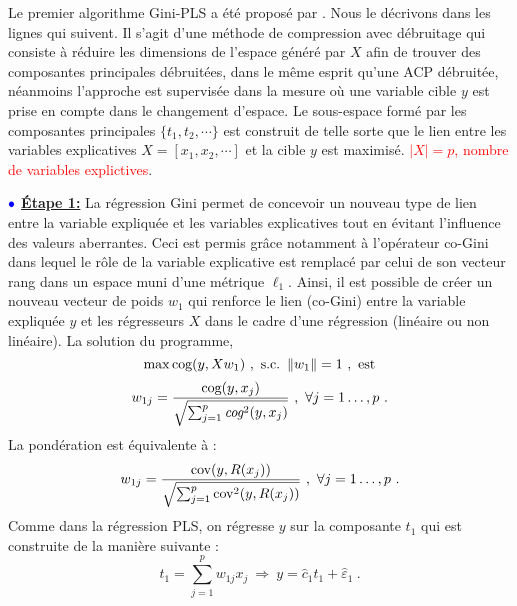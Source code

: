 Le premier algorithme Gini-PLS a été proposé par \citet{mussard2018ginipls}. Nous le décrivons dans les lignes qui suivent. Il s'agit d'une méthode de compression avec débruitage qui consiste à réduire les dimensions de l'espace généré par $X$ afin de trouver des composantes principales débruitées, dans le même esprit qu'une ACP débruitée, néanmoins l'approche est supervisée dans la mesure où une variable cible $y$ est prise en compte dans le changement d'espace. Le sous-espace formé par les composantes principales $\{t_1,t_2,\cdots\}$ est construit de telle sorte que le lien entre les variables explicatives $X = [x_1,x_2,\cdots]$ et la cible $y$ est maximisé.  \textcolor{red}{$\vert X \vert = p$, nombre de variables explictives}.

\medskip

$\bulle$ \underline{\textbf{Étape 1:}} La régression Gini permet de concevoir un nouveau type de lien entre la variable expliquée et les variables explicatives tout en évitant l'influence des valeurs aberrantes. Ceci est permis grâce notamment à l'opérateur co-Gini dans lequel le rôle de la variable explicative est remplacé par celui de son vecteur rang dans un espace muni d'une métrique $\ell_1$.  Ainsi, il est possible de créer un nouveau vecteur de poids $w_1$ qui renforce le lien (co-Gini) entre la variable expliquée $y$ et les régresseurs $X$ dans le cadre d'une régression (linéaire ou non linéaire).
\newline La solution du programme,
\[
\max \cog(y,X w_1) \ , \ \text{s.c.} \ \left\|w_1\right\|=1 \ , \ \text{est}
\]
\begin{equation}\notag
w_{1j} = \frac{\text{cog}(y,x_j)}{\sqrt{\sum_{j=1}^p \emph{cog}^2(y,x_j)}} \ , \ \forall j = 1\ldots,p \ .
\end{equation}
La pondération est équivalente à :
\begin{equation}\notag
w_{1j} = \frac{\text{cov}(y,R(x_j))}{\sqrt{\sum_{j=1}^p \text{cov}^2(y,R(x_j))}} \ , \ \forall j = 1\ldots,p \ .
\end{equation}
Comme dans la régression PLS, on régresse $y$ sur la composante $t_1$ qui est construite de la manière suivante :
\[
t_1 = \sum_{j=1}^p w_{1j}x_j \ \Longrightarrow \ y = \hat{c}_1 t_1 + \hat{\varepsilon}_1 \ .
\]

\medskip

